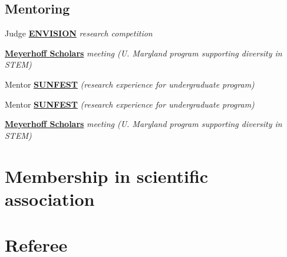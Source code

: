 \documentclass{cvlfoc}
\begin{document}
\subsection*{Mentoring}

\begin{entrydate}
		{Judge}
		{\href{http://envisionrc.com/}{\textbf{ENVISION}}
			\emph{research competition}}

		{}
		{\href{https://meyerhoff.umbc.edu/}{\textbf{Meyerhoff Scholars}}
			\emph{meeting (U. Maryland program supporting diversity in STEM)}}

		{Mentor}
		{\href{https://sunfest.seas.upenn.edu}{\textbf{SUNFEST}}
			\emph{(research experience for undergraduate program)}}

		{Mentor}
		{\href{https://sunfest.seas.upenn.edu}{\textbf{SUNFEST}}
			\emph{(research experience for undergraduate program)}}

		{}
		{\href{https://meyerhoff.umbc.edu/}{\textbf{Meyerhoff Scholars}}
			\emph{meeting (U. Maryland program supporting diversity in STEM)}}
\end{entrydate}


\section*{Membership in scientific association}

\begin{entrydate}
\end{entrydate}
\vspace{\entrysep}



\section*{Referee}
\end{document}
